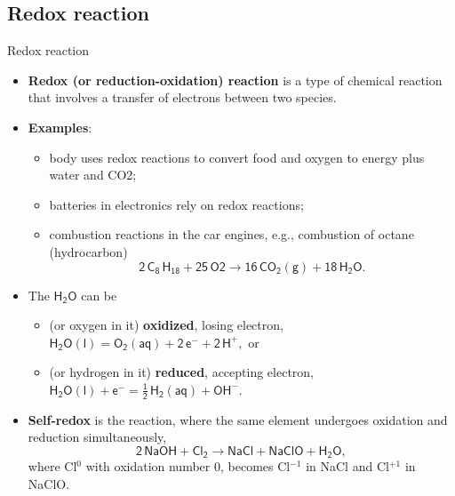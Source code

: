 \subsection{Redox reaction}
%	
%
\begin{frame}{Redox reaction}
	\small
	\begin{itemize}
		\item \alert{\textbf{Redox (or reduction-oxidation) reaction}} is a type of chemical reaction that involves a transfer 
		of electrons between two species.
		\pause
		\item { \bf Examples}: 
		\begin{itemize}
				\item body uses redox reactions to convert food and oxygen to energy plus water and CO2;
				\item batteries in electronics rely on redox reactions;
				\item combustion reactions in the car engines, e.g., combustion of octane (hydrocarbon)
				\[
				\mathsf{2 \, C_8\, H_{18} + 25\,O2 \rightarrow 16\, CO_2(g) + 18\,H_2O}.
				\]			
		\end{itemize}
		\pause
		\item The $\mathsf{H_2O}$ can be 
		\begin{itemize}
			\item (or oxygen in it) \alert{\bf oxidized}, losing electron, 
			$\mathsf{H_2O(l) = O_2(aq) + 2\, e^{-} + 2\, H^+,}$ or 
			
			\item (or hydrogen in it) \alert{\bf reduced}, accepting electron, 
			$
			\mathsf{H_2O(l) + e^{-} = \tfrac{1}{2} \, H_2(aq) + OH^-.}$
		\end{itemize}
		\pause
		\item \alert{\bf Self-redox} is the reaction, where the same element undergoes oxidation and reduction simultaneously,  
		\[
		\mathsf{2\, NaOH + Cl_2 \rightarrow NaCl + NaClO + H_2O,}
		\]
		where Cl$^0$ with oxidation number 0, becomes Cl$^{-1}$  in NaCl and Cl$^{+1}$  in NaClO. 
	\end{itemize}
\end{frame}
